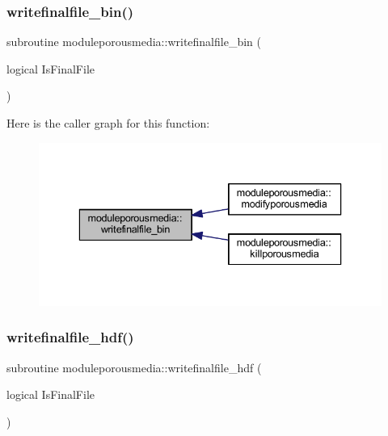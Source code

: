 \subsubsection{\texorpdfstring{writefinalfile\+\_\+bin()}{writefinalfile\_bin()}}
{\footnotesize\ttfamily subroutine moduleporousmedia\+::writefinalfile\+\_\+bin (\begin{DoxyParamCaption}\item[{logical}]{Is\+Final\+File }\end{DoxyParamCaption})\hspace{0.3cm}{\ttfamily [private]}}

Here is the caller graph for this function\+:\nopagebreak
\begin{figure}[H]
\begin{center}
\leavevmode
\includegraphics[width=336pt]{namespacemoduleporousmedia_a98c9f7f64e2362f9f4a6d161dc8a7c99_icgraph}
\end{center}
\end{figure}
\mbox{\label{namespacemoduleporousmedia_aa65138badcf5c2f27aad4149d87bcd10}} 
\subsubsection{\texorpdfstring{writefinalfile\+\_\+hdf()}{writefinalfile\_hdf()}}
{\footnotesize\ttfamily subroutine moduleporousmedia\+::writefinalfile\+\_\+hdf (\begin{DoxyParamCaption}\item[{logical}]{Is\+Final\+File }\end{DoxyParamCaption})\hspace{0.3cm}{\ttfamily [private]}}

